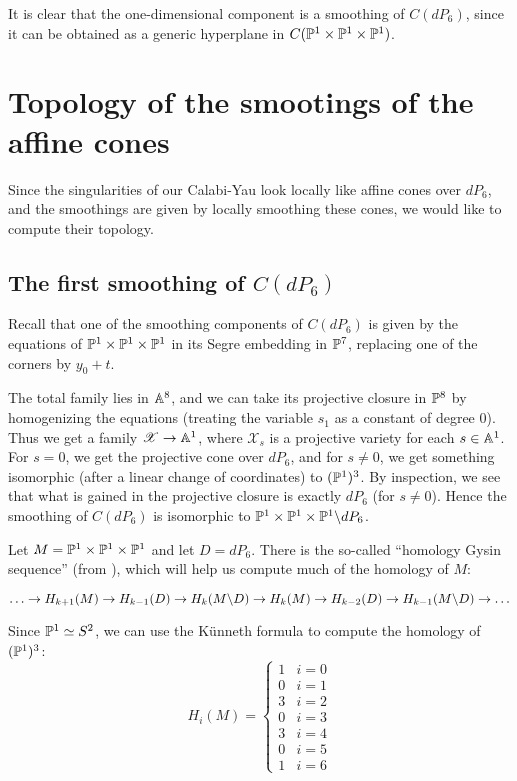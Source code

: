 \documentclass[11pt, english]{article}
\begin{document}
It is clear that the one-dimensional component is a smoothing of $C(dP_6)$, since it can be obtained as a generic hyperplane in $C(\mathbb{P}^1 \times \mathbb{P}^1 \times \mathbb{P}^1)$.

\section{Topology of the smootings of the affine cones}

Since the singularities of our Calabi-Yau look locally like affine cones over $dP_6$, and the smoothings are given by locally smoothing these cones, we would like to compute their topology. 

\subsection{The first smoothing of $C(dP_6)$}

Recall that one of the smoothing components of $C(dP_6)$ is given by the equations of $\mathbb{P}^1 \times \mathbb{P}^1 \times \mathbb{P}^1$ in its Segre embedding in $\mathbb{P}^7$, replacing one of the corners by $y_0+t$.

The total family lies in $\mathbb{A}^8$, and we can take its projective closure in $\mathbb{P}^8$ by homogenizing the equations (treating the variable $s_1$ as a constant of degree $0$). Thus we get a family $\mathscr X \to \mathbb{A}^1$, where $\mathscr X_s$ is a projective variety for each $s \in \mathbb{A}^1$. For $s=0$, we get the projective cone over $dP_6$, and for $s \neq 0$, we get something isomorphic (after a linear change of coordinates) to $(\mathbb{P}^1)^3$. By inspection, we see that what is gained in the projective closure is exactly $dP_6$ (for $s \neq 0$). Hence the smoothing of $C(dP_6)$ is isomorphic to $\mathbb{P}^1 \times \mathbb{P}^1 \times \mathbb{P}^1 \backslash dP_6$.

Let $M = \mathbb{P}^1 \times \mathbb{P}^1 \times \mathbb{P}^1$ and let $D=dP_6$. There is the so-called ``homology Gysin sequence'' (from \cite{dimca_singularities}), which will help us compute much of the homology of $M$:

\[
\ldots \to H_{k+1}(M) \to H_{k-1}(D) \to H_k(M \backslash D) \to H_k(M) \to H_{k-2}(D) \to H_{k-1}(M \backslash D) \to \ldots 
\]

Since $\mathbb{P}^1 \simeq S^2$, we can use the Künneth formula to compute the homology of $(\mathbb{P}^1)^3$: 
\[
H_i(M) = \begin{cases}
1 & i = 0 \\
0 & i = 1 \\
3 & i = 2 \\
0 & i = 3 \\
3 & i = 4 \\
0 & i = 5 \\
1 & i = 6
\end{cases}
\]
\end{document}
